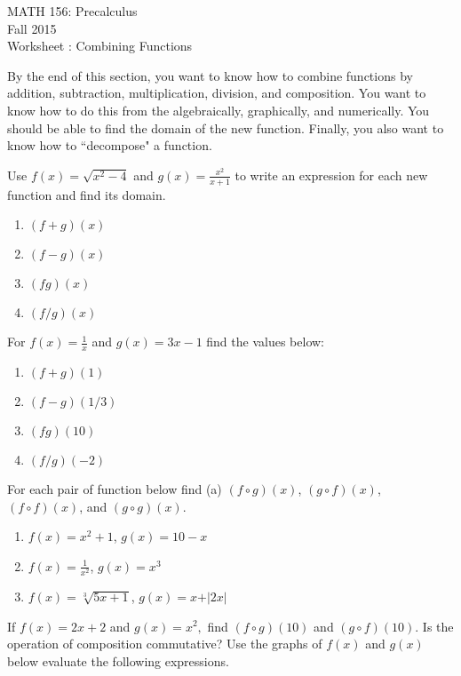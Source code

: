 \documentclass[11pt]{article}
\newcommand{\sect}{\textsection}
\begin{document}
 

\begin{center}MATH 156: Precalculus  \\ Fall 2015 \\ Worksheet \sect 2.7: Combining Functions\end{center}

\hrulefill

By the end of this section, you want to  know how to combine functions by addition, subtraction, multiplication, division, and composition. You want to know how to do this from the algebraically, graphically, and numerically. You should be able to find the domain of the new function. Finally, you also want to know how to ``decompose" a function.

\hrulefill

{} Use $f(x)=\sqrt{x^2-4}$ and $g(x)=\frac{x^2}{x+1}$ to write an expression for each new function and find its domain.
\begin{enumerate}
\item $(f+g)(x)$
\vfill
\item $(f-g)(x)$
\vfill
\item $(fg)(x)$
\vfill
\item $(f/g)(x)$
\vfill
\end{enumerate}

{} For $f(x)=\frac{1}{x}$ and $g(x)=3x-1$ find the values below:
\begin{enumerate}
\item $(f+g)(1)$
\vfill
\item $(f-g)(1/3)$
\vfill
\item $(fg)(10)$
\vfill
\item $(f/g)(-2)$
\vfill
\end{enumerate}

\newpage

{}  For each pair of function below find (a) $(f \circ g)(x)$, $(g\circ f)(x)$, $(f \circ f)(x)$, and $(g \circ g)(x)$.
\begin{enumerate}
\item $f(x)=x^2+1$, $g(x)=10-x$
\vfill
\item $f(x)=\frac{1}{x^2}$, $g(x)=x^3$
\vfill
\item $f(x)=\sqrt[3]{5x+1}$, $g(x)=x+\vert 2x \vert$
\vfill
\end{enumerate}

{} If $f(x)=2x+2$ and $g(x)=x^2,$ find $(f \circ g)(10)$ and $(g\circ f)(10)$. Is the operation of composition commutative?
\vspace{1in}
\newpage
 {} Use the graphs of $f(x)$ and $g(x)$  below evaluate the following expressions.
\end{document}
